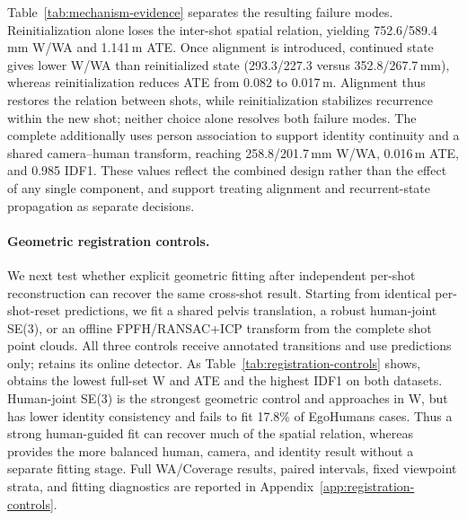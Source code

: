 Table~\ref{tab:mechanism-evidence} separates the resulting failure modes.
Reinitialization alone loses the inter-shot spatial relation, yielding
752.6/589.4\,mm W/WA and 1.141\,m ATE. Once alignment is introduced,
continued state gives lower W/WA than reinitialized state
(293.3/227.3 versus 352.8/267.7\,mm), whereas reinitialization reduces ATE
from 0.082 to 0.017\,m. Alignment thus restores the relation between shots,
while reinitialization stabilizes recurrence within the new shot; neither
choice alone resolves both failure modes. The complete \method{} additionally
uses person association to support identity continuity and a shared
camera--human transform, reaching 258.8/201.7\,mm W/WA, 0.016\,m ATE, and
0.985 IDF1. These values reflect the combined design rather than the effect of
any single component, and support treating alignment and recurrent-state
propagation as separate decisions.

\paragraph{Geometric registration controls.}
We next test whether explicit geometric fitting after independent per-shot
reconstruction can recover the same cross-shot result. Starting from identical
per-shot-reset predictions, we fit a shared pelvis translation, a robust
human-joint SE(3), or an offline FPFH/RANSAC+ICP transform from the complete
shot point clouds. All three controls receive annotated transitions and use
predictions only; \method{} retains its online detector. As
Table~\ref{tab:registration-controls} shows, \method{} obtains the lowest
full-set W and ATE and the highest IDF1 on both datasets. Human-joint SE(3) is
the strongest geometric control and approaches \method{} in W, but has lower
identity consistency and fails to fit 17.8\% of EgoHumans cases. Thus a strong
human-guided fit can recover much of the spatial relation, whereas \method{}
provides the more balanced human, camera, and identity result without a
separate fitting stage. Full WA/Coverage results, paired intervals, fixed
viewpoint strata, and fitting diagnostics are reported in
Appendix~\ref{app:registration-controls}.

